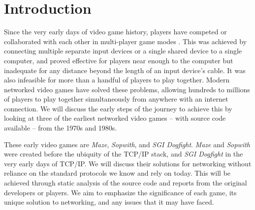 \section{Introduction}
\label{sec:intro}


Since the very early days of video game history, players have competed or collaborated with each other in multi-player game modes \cite{bnlfirst}. This was achieved by connecting multiple separate input devices or a single shared device to a single computer, and proved effective for players near enough to the computer but inadequate for any distance beyond the length of an input device's cable. It was also infeasible for more than a handful of players to play together. Modern networked video games have solved these problems, allowing hundreds to millions of players to play together simultaneously from anywhere with an internet connection. We will discuss the early steps of the journey to achieve this by looking at three of the earliest networked video games -- with source code available -- from the 1970s and 1980s. 

These early video games are \textit{Maze}, \textit{Sopwith}, and \textit{SGI Dogfight}. \textit{Maze} and \textit{Sopwith} were created before the ubiquity of the TCP/IP stack, and \textit{SGI Dogfight} in the very early days of TCP/IP. We will discuss their solutions for networking without reliance on the standard protocols we know and rely on today. This will be achieved through static analysis of the source code and reports from the original developers or players. We aim to emphasize the significance of each game, its unique solution to networking, and any issues that it may have faced.
